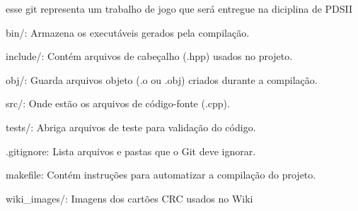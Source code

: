 esse git representa um trabalho de jogo que será entregue na diciplina de PDSII


\begin{DoxyItemize}
\item bin/\+: Armazena os executáveis gerados pela compilação.
\item include/\+: Contém arquivos de cabeçalho (.hpp) usados no projeto.
\item obj/\+: Guarda arquivos objeto (.o ou .obj) criados durante a compilação.
\item src/\+: Onde estão os arquivos de código-\/fonte (.cpp).
\item tests/\+: Abriga arquivos de teste para validação do código.
\item .gitignore\+: Lista arquivos e pastas que o Git deve ignorar.
\item makefile\+: Contém instruções para automatizar a compilação do projeto.
\item wiki\+\_\+images/\+: Imagens dos cartões CRC usados no Wiki 
\end{DoxyItemize}